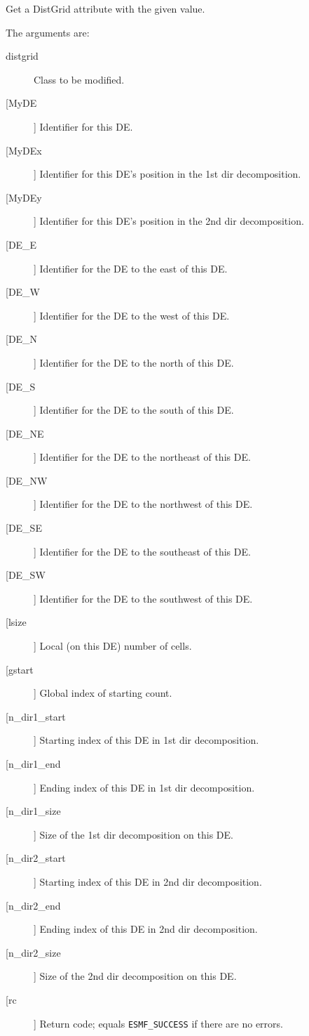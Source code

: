       Get a DistGrid attribute with the given value.
  
       The arguments are:
       \begin{description}
       \item[distgrid]
            Class to be modified.
       \item[[MyDE]]
            Identifier for this DE.
       \item[[MyDEx]]
            Identifier for this DE's position in the 1st dir decomposition.
       \item[[MyDEy]]
            Identifier for this DE's position in the 2nd dir decomposition.
       \item[[DE\_E]]
            Identifier for the DE to the east of this DE.
       \item[[DE\_W]]
            Identifier for the DE to the west of this DE.
       \item[[DE\_N]]
            Identifier for the DE to the north of this DE.
       \item[[DE\_S]]
            Identifier for the DE to the south of this DE.
       \item[[DE\_NE]]
            Identifier for the DE to the northeast of this DE.
       \item[[DE\_NW]]
            Identifier for the DE to the northwest of this DE.
       \item[[DE\_SE]]
            Identifier for the DE to the southeast of this DE.
       \item[[DE\_SW]]
            Identifier for the DE to the southwest of this DE.
       \item[[lsize]]
            Local (on this DE) number of cells.
       \item[[gstart]]
            Global index of starting count.
       \item[[n\_dir1\_start]]
            Starting index of this DE in 1st dir decomposition.
       \item[[n\_dir1\_end]] 
            Ending index of this DE in 1st dir decomposition.
       \item[[n\_dir1\_size]]
            Size of the 1st dir decomposition on this DE.
       \item[[n\_dir2\_start]]
            Starting index of this DE in 2nd dir decomposition.
       \item[[n\_dir2\_end]]
            Ending index of this DE in 2nd dir decomposition.
       \item[[n\_dir2\_size]]
            Size of the 2nd dir decomposition on this DE.
       \item[[rc]]
            Return code; equals {\tt ESMF\_SUCCESS} if there are no errors.
       \end{description}
   
